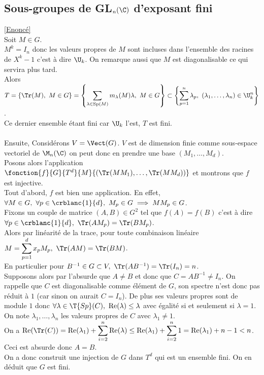 \documentclass[8pt]{book}
\begin{document}
\subsection{Sous-groupes de GL$_n(\C)$ d'exposant fini }
\label{Sous-groupes de GL_n(C) d'exposant fini corrigé}
\textcolor{blue}{\hyperref[Sous-groupes de GL_n(C) d'exposant fini]{[Enoncé]}}\\
Soit $M\in G$.\\
$M^k=I_n$ donc les valeurs propres de $M$ sont incluses dans l'ensemble des racines de $X^k-1$ c'est à dire $\U_k$. On remarque aussi que $M$ est diagonalisable ce qui servira plus tard.\\
Alors $T=\{\Tr(M),\ M\in G\}=\displaystyle\left\{\sum_{\lambda\in \text{Sp}(M)}m_\lambda(M)\lambda,\ M\in G\right\}\subset \left\{\sum_{p=1}^n\lambda_p,\ (\lambda_1,\dots,\lambda_n)\in \U_k^n\right\}$.\\
Ce dernier ensemble étant fini car $\U_k$ l'est, $T$ est fini.\\\\
Ensuite, Considérons $V=\Vect(G)$. $V$ est de dimension finie comme sous-espace vectoriel de $\M_n(\C)$ on peut donc en prendre une base $(M_1,\dots,M_d)$.\\
Posons alors l'application $\fonction{f}{G}{T^d}{M}{(\Tr(MM_1),\dots,\Tr(MM_d))}$ et montrons que $f$ est injective.\\
Tout d'abord, $f$ est bien une application. En effet, $\forall M\in G,\ \forall p\in \crblanc{1}{d},\ M_p\in G\implies MM_p\in G$.\\
Fixons un couple de matrice $(A,B)\in G^2$ tel que $f(A)=f(B)$ c'est à dire $\forall p\in \crblanc{1}{d},\ \Tr(AM_p)=\Tr(BM_p)$.\\
Alors par linéarité de la trace, pour toute combinaison linéaire $M=\displaystyle\sum_{p=1}^dx_pM_p,\ \Tr(AM)=\Tr(BM)$.\\
En particulier pour $B^{-1}\in G\subset V,\ \Tr(AB^{-1})=\Tr(I_n)=n$.\\
Supposons alors par l'absurde que $A\ne B$ et donc que $C=AB^{-1}\ne I_n$. On rappelle que $C$ est diagonalisable comme élément de $G$, son spectre n'est donc pas réduit à $1$ (car sinon on aurait $C=I_n$). De plus ses valeurs propres sont de module $1$ donc $\forall \lambda\in \T{Sp}(C),\ \operatorname{Re}(\lambda)\leq \lambda$ avec égalité si et seulement si $\lambda=1$.\\
On note $\lambda_1,\dots,\lambda_n$ les valeurs propres de $C$ avec $\lambda_1\ne 1$.\\
On a $\operatorname{Re}(\Tr(C))=\operatorname{Re}(\lambda_1)+\displaystyle\sum_{i=2}^n\operatorname{Re}(\lambda)\leq \operatorname{Re}(\lambda_1)+\sum_{i=2}^n1=\operatorname{Re}(\lambda_1)+n-1<n$.\\
Ceci est absurde donc $A=B$.\\
On a donc construit une injection de $G$ dans $T^d$ qui est un ensemble fini. On en déduit que $G$ est fini.
	
\end{document}
